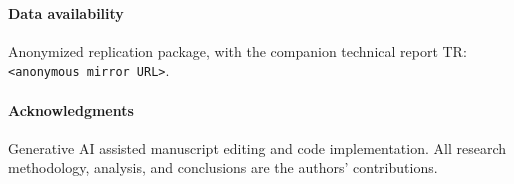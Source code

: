 \documentclass[10pt,conference]{IEEEtran}
\newif\ifdraftbib
\newcommand{\TR}{TR}
\begin{document}
\paragraph{Data availability} Anonymized replication package, with the companion technical
report \TR{}: \texttt{<anonymous mirror URL>}.
\paragraph{Acknowledgments} Generative AI assisted manuscript editing and code implementation. All research methodology, analysis, and conclusions are the authors' contributions. 
 


\ifdraftbib\nocite{*}\fi

\end{document}
